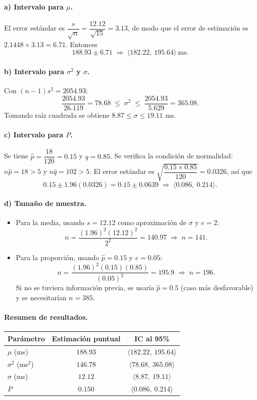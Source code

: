 \documentclass[10pt,letterpaper]{article}
\begin{document}
\paragraph{a) Intervalo para $\mu$.} El error estándar es $\dfrac{s}{\sqrt{n}}=\dfrac{12.12}{\sqrt{15}}=3.13$, de modo que el error de estimación es $2.1448\times 3.13 = 6.71$. Entonces
\[
    188.93 \pm 6.71 \;\Longrightarrow\; \langle 182.22,\ 195.64 \rangle \ \text{ms}.
\]

\paragraph{b) Intervalo para $\sigma^2$ y $\sigma$.} Con $(n-1)s^2 = 2054.93$:
\[
    \frac{2054.93}{26.119}=78.68 \;\le\; \sigma^2 \;\le\; \frac{2054.93}{5.629}=365.08 .
\]
Tomando raíz cuadrada se obtiene $8.87 \le \sigma \le 19.11$ ms.

\paragraph{c) Intervalo para $P$.} Se tiene $\hat{p}=\dfrac{18}{120}=0.15$ y $\hat{q}=0.85$. Se verifica la condición de normalidad: $n\hat{p}=18>5$ y $n\hat{q}=102>5$. El error estándar es $\sqrt{\dfrac{0.15\times 0.85}{120}}=0.0326$, así que
\[
    0.15 \pm 1.96(0.0326)=0.15 \pm 0.0639 \;\Longrightarrow\; \langle 0.086,\ 0.214 \rangle .
\]

\paragraph{d) Tamaño de muestra.}
\begin{itemize}
    \item Para la media, usando $s=12.12$ como aproximación de $\sigma$ y $e=2$:
    \[
        n = \frac{(1.96)^2(12.12)^2}{2^2} = 140.97 \;\Rightarrow\; n=141 .
    \]
    \item Para la proporción, usando $\hat{p}=0.15$ y $e=0.05$:
    \[
        n = \frac{(1.96)^2(0.15)(0.85)}{(0.05)^2}=195.9 \;\Rightarrow\; n=196 .
    \]
    Si no se tuviera información previa, se usaría $\hat{p}=0.5$ (caso más desfavorable) y se necesitarían $n=385$.
\end{itemize}

\paragraph{Resumen de resultados.}
\begin{center}
\begin{tabular}{|l|c|c|}
\hline
\textbf{Parámetro} & \textbf{Estimación puntual} & \textbf{IC al 95\%} \\ \hline
$\mu$ (ms) & $188.93$ & $\langle 182.22,\ 195.64 \rangle$ \\ \hline
$\sigma^2$ (ms$^2$) & $146.78$ & $\langle 78.68,\ 365.08 \rangle$ \\ \hline
$\sigma$ (ms) & $12.12$ & $\langle 8.87,\ 19.11 \rangle$ \\ \hline
$P$ & $0.150$ & $\langle 0.086,\ 0.214 \rangle$ \\ \hline
\end{tabular}
\end{center}
\end{document}
